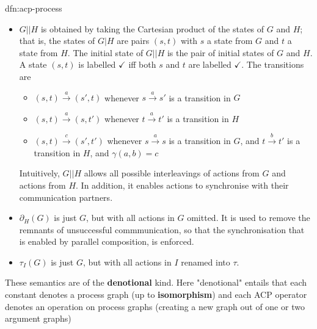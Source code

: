 \documentclass{article}
\begin{document}
\begin{dfn}{dfn:acp-process}{}
\begin{itemize}
            \textbf{root} is labelled with $\checkmark$ if either $I_{G}$ or $I_{H}$ is.
        \item $G | | H$ is obtained by taking the Cartesian product of the states of $G$ and $H$; that is, the states of $G | H$ are pairs $(s, t)$ with $s$ a state from $G$ and $t$ a state from $H$. The initial state of $G | | H$ is the pair of initial states of $G$ and $H$. A state $(s, t)$ is labelled $\checkmark$ iff both $s$ and $t$ are labelled $\checkmark$. The transitions are
            \begin{itemize}
                \item $(s, t) \xrightarrow{a} (s', t)$ whenever $s \xrightarrow{a} s'$ is a transition in $G$
                \item $(s, t) \xrightarrow{a} (s, t')$ whenever $t \xrightarrow{a} t'$ is a transition in $H$
                \item $(s, t) \xrightarrow{c} (s', t')$ whenever $s \xrightarrow{a} s$ is a transition in $G$, and $t \xrightarrow{b} t'$ is a transition in $H$, and $\gamma(a,b) = c$
            \end{itemize}
        Intuitively, $G | | H$ allows all possible interleavings of actions from $G$ and actions from $H$. In addition, it enables actions to synchronise with their communication partners.
        \item $\partial_{H}(G)$ is just $G$, but with all actions in $G$ omitted. It is used to remove the remnants of unsuccessful commmunication, so that the synchronisation that is enabled by parallel composition, is enforced.
        \item $\tau_{I}(G)$ is just $G$, but with all actions in $I$ renamed into $\tau$.
    \end{itemize}
\end{dfn}

These semantics are of the \textbf{denotional} kind. Here "denotional" entails that each constant denotes a process graph (up to \textbf{isomorphism}) and each ACP operator denotes an operation on process graphs (creating a new graph out of one or two argument graphs)

\newpage
\end{document}
